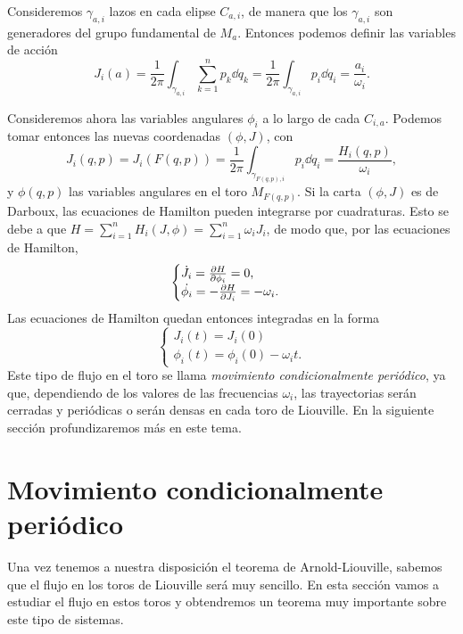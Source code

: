   Consideremos $\gamma_{a,i}$ lazos en cada elipse $C_{a,i}$, de manera que los $\gamma_{a,i}$ son generadores del grupo fundamental de $M_a$. Entonces podemos definir las variables de acción 
  \begin{equation*}
    J_i(a) = \frac{1}{2\pi}\int_{\gamma_{a,i}}\sum_{k=1}^n  p_k \dd q_k=\frac{1}{2\pi}\int_{\gamma_{a,i}}  p_i \dd q_i=\frac{a_i}{\omega_i}.
  \end{equation*}

  Consideremos ahora las variables angulares $\phi_i$ a lo largo de cada $C_{i,a}$. Podemos tomar entonces las nuevas coordenadas $(\phi,J)$, con
  \begin{equation*}
    J_i(q,p)=J_i(F(q,p))=\frac{1}{2\pi}\int_{\gamma_{F(q,p),i}} p_i \dd q_i= \frac{H_i(q,p)}{\omega_i},
  \end{equation*}
  y $\phi(q,p)$ las variables angulares en el toro $M_{F(q,p)}$.
  Si la carta $(\phi,J)$ es de Darboux, las ecuaciones de Hamilton pueden integrarse por cuadraturas. Esto se debe a que $H=\sum_{i=1}^n H_i(J,\phi)=\sum_{i=1}^n \omega_i J_i$, de modo que, por las ecuaciones de Hamilton,
\begin{equation*}
  \begin{cases}
  \dot{J_i}=\frac{\partial H}{\partial \phi_i}=0,\\
  \dot{\phi_i}=-\frac{\partial H}{\partial J_i} = -\omega_i.
  \end{cases}
\end{equation*}
 Las ecuaciones de Hamilton quedan entonces integradas en la forma
\begin{equation*}
  \begin{cases}
  J_i(t)=  J_i(0) \\
  \phi_i(t) =  \phi_i(0) - \omega_i t.
\end{cases}
\end{equation*}
Este tipo de flujo en el toro se llama \emph{movimiento condicionalmente periódico}, ya que, dependiendo de los valores de las frecuencias $\omega_i$, las trayectorias serán cerradas y periódicas o serán densas en cada toro de Liouville. En la siguiente sección profundizaremos más en este tema.

\section{Movimiento condicionalmente periódico}\label{sec:promedios}
Una vez tenemos a nuestra disposición el teorema de Arnold-Liouville, sabemos que el flujo en los toros de Liouville será muy sencillo. En esta sección vamos a estudiar el flujo en estos toros y obtendremos un teorema muy importante sobre este tipo de sistemas.


